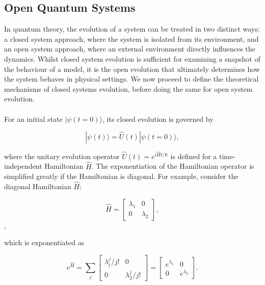 \documentclass[11pt]{article}
\begin{document}
\subsection{Open Quantum Systems} \label{sec:theory_sub_OQS}

In quantum theory, the evolution of a system can be treated in two distinct ways: a closed system approach, where the system is isolated from its environment, and an open system approach, where an external environment directly influences the dynamics. Whilst closed system evolution is sufficient for examining a snapshot of the behaviour of a model, it is the open evolution that ultimately determines how the system behaves in physical settings. We now proceed to define the theoretical mechanisms of closed systems evolution, before doing the same for open system evolution.\\
\\
For an initial state $|\psi (t=0)\rangle$, its closed evolution is governed by

\begin{equation} \label{eqn:closed_evo}
    |\psi(t)\rangle = \hat{U}(t)|\psi(t=0)\rangle,
\end{equation}

where the unitary evolution operator $\hat{U}(t) = e^{i\hat{H}t/\hbar}$ is defined for a time-independent Hamiltonian $\hat{H}$. The exponentiation of the Hamiltonian operator is simplified greatly if the Hamiltonian is diagonal. For example, consider the diagonal Hamiltonian $\hat{H}$:

\begin{equation*}
    \hat{H} = 
    \begin{bmatrix}
        \lambda_1 & 0 \\
        0 & \lambda_2
    \end{bmatrix},
\end{equation*}, 

which is exponentiated as

\begin{equation*}
    e^{\hat{H}} = \sum_j 
    \begin{bmatrix}
        \lambda_i^j/j! & 0 \\
        0 & \lambda_2^j/j!
    \end{bmatrix}
    = \begin{bmatrix}
        e^{\lambda_1} & 0 \\
        0 & e^{\lambda_2}
    \end{bmatrix}.
\end{equation*}
\end{document}
